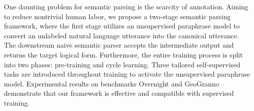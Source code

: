 One daunting problem for semantic parsing is the scarcity of annotation. Aiming to reduce nontrivial human labor, we propose a two-stage semantic parsing framework, where the first stage utilizes an unsupervised paraphrase model to convert an unlabeled natural language utterance into the canonical utterance. The downstream naive semantic parser accepts the intermediate output and returns the target logical form. Furthermore, the entire training process is split into two phases: pre-training and cycle learning. Three tailored self-supervised tasks are introduced throughout training to activate the unsupervised paraphrase model. Experimental results on benchmarks Overnight and GeoGranno demonstrate that our framework is effective and compatible with supervised training.
